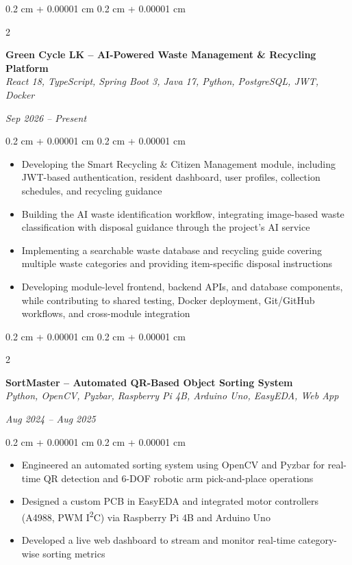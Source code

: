 \documentclass[10pt, letterpaper]{article}
\newenvironment{highlights}{
	\vspace{0.05 cm}
	\begin{itemize}[
		topsep=0.10 cm,
		parsep=0.10 cm,
		partopsep=0pt,
		itemsep=0pt,
		leftmargin=0.4 cm + 10pt
		]
	}{
	\end{itemize}
}
\newenvironment{onecolentry}{
	\begin{adjustwidth}{
			0.2 cm + 0.00001 cm
		}{
			0.2 cm + 0.00001 cm
		}
	}{
	\end{adjustwidth}
}
\newenvironment{twocolentry}[2][]{
	\onecolentry
	\def\secondColumn{#2}
	\setcolumnwidth{\fill, 4.5 cm}
	\begin{paracol}{2}
	}{
		\switchcolumn \raggedleft \secondColumn
	\end{paracol}
	\endonecolentry
}
\begin{document}
	\vspace{0.35 cm}

	\begin{twocolentry}{
		\textit{Sep 2026 -- Present}
	}
		\textbf{Green Cycle LK -- AI-Powered Waste Management \& Recycling Platform}\\
		\textit{React 18, TypeScript, Spring Boot 3, Java 17, Python, PostgreSQL, JWT, Docker}
	\end{twocolentry}
	\vspace{0.10 cm}
	\begin{onecolentry}
		\begin{highlights}
			\item Developing the Smart Recycling \& Citizen Management module, including JWT-based authentication, resident dashboard, user profiles, collection schedules, and recycling guidance
			\item Building the AI waste identification workflow, integrating image-based waste classification with disposal guidance through the project's AI service
			\item Implementing a searchable waste database and recycling guide covering multiple waste categories and providing item-specific disposal instructions
			\item Developing module-level frontend, backend APIs, and database components, while contributing to shared testing, Docker deployment, Git/GitHub workflows, and cross-module integration
		\end{highlights}
	\end{onecolentry}

	\vspace{0.35 cm}

	\begin{twocolentry}{
		\textit{Aug 2024 -- Aug 2025}
	}
		\textbf{SortMaster -- Automated QR-Based Object Sorting System}\\
		\textit{Python, OpenCV, Pyzbar, Raspberry Pi 4B, Arduino Uno, EasyEDA, Web App}
	\end{twocolentry}
	\vspace{0.10 cm}
	\begin{onecolentry}
		\begin{highlights}
			\item Engineered an automated sorting system using OpenCV and Pyzbar for real-time QR detection and 6-DOF robotic arm pick-and-place operations
			\item Designed a custom PCB in EasyEDA and integrated motor controllers (A4988, PWM I\textsuperscript{2}C) via Raspberry Pi 4B and Arduino Uno
			\item Developed a live web dashboard to stream and monitor real-time category-wise sorting metrics
		\end{highlights}
	\end{onecolentry}
\end{document}
